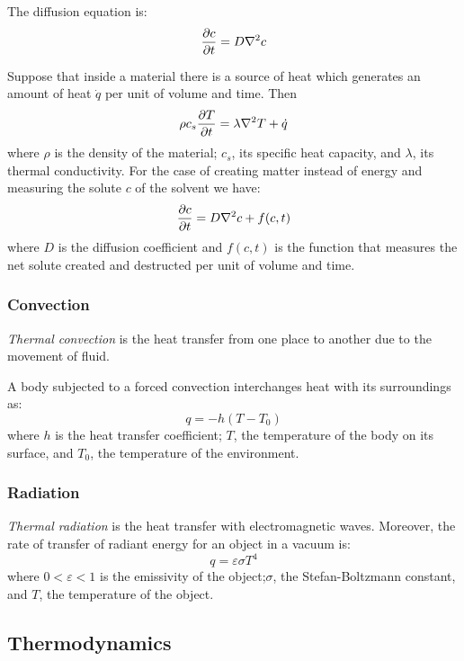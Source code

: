 \documentclass[../../../main.tex]{subfiles}
\begin{document}
\begin{multicols}{2}
\begin{prop}
        The diffusion equation is: $$\pdv{c}{t}=D\nabla^2 c$$
    \end{prop}
    \begin{prop}
        Suppose that inside a material there is a source of heat which generates an amount of heat $\dot{q}$ per unit of volume and time. Then
        $$\rho c_s\pdv{T}{t}=\lambda\nabla^2T+\dot{q}$$
        where $\rho$ is the density of the material; $c_s$, its specific heat capacity, and $\lambda$, its thermal conductivity.
        For the case of creating matter instead of energy and measuring the solute $c$ of the solvent we have:
        $$\pdv{c}{t}=D\nabla^2c+f(c,t)$$
        where $D$ is the diffusion coefficient and $f(c,t)$ is the function that measures the net solute created and destructed per unit of volume and time.
    \end{prop}
    \subsubsection*{Convection}
    \begin{definition}[Convection]
        \textit{Thermal convection} is the heat transfer from one place to another due to the movement of fluid.
    \end{definition}
    \begin{prop}
        A body subjected to a forced convection interchanges heat with its surroundings as: $$q=-h(T-T_0)$$ where $h$ is the heat transfer coefficient; $T$, the temperature of the body on its surface, and $T_0$, the temperature of the environment.
    \end{prop}
    \subsubsection*{Radiation}
    \begin{definition}[Radiation]
        \textit{Thermal radiation} is the heat transfer with electromagnetic waves. Moreover, the rate of transfer of radiant energy for an object in a vacuum is: $$q=\varepsilon\sigma T^4$$ where $0<\varepsilon<1$ is the emissivity of the object;$\sigma$, the Stefan-Boltzmann constant, and $T$, the temperature of the object.
    \end{definition}
    \subsection{Thermodynamics}
\end{multicols}
\end{document}
